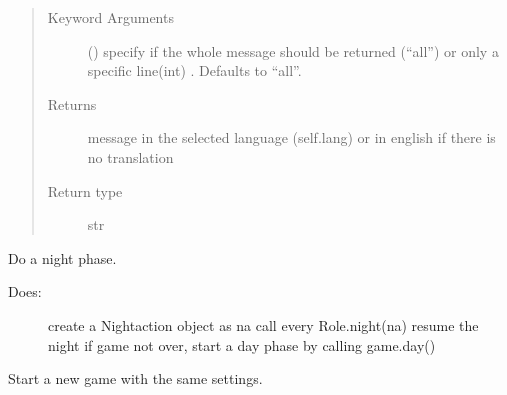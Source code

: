 \documentclass[letterpaper,10pt,english]{sphinxmanual}
\begin{document}
\begin{fulllineitems}
\begin{fulllineitems}
\begin{quote}
\begin{description}
\item[{Keyword Arguments}] \leavevmode
{} (\sphinxstyleliteralemphasis{\sphinxupquote{, }}) \textendash{} specify if the whole message should be returned (“all”)
or only a specific line(int) . Defaults to “all”.

\item[{Returns}] \leavevmode
message in the selected language (self.lang) or in english if there is no translation

\item[{Return type}] \leavevmode
str

\end{description}\end{quote}

\end{fulllineitems}


\begin{fulllineitems}
\label{\detokenize{chatwolf:chatwolf.game.Game.night}}
Do a night phase.
\begin{description}
\item[{Does:}] \leavevmode
create a Nightaction object as na
call every Role.night(na)
resume the night
if game not over, start a day phase by calling game.day()

\end{description}

\end{fulllineitems}


\begin{fulllineitems}
\label{\detokenize{chatwolf:chatwolf.game.Game.restart}}
Start a new game with the same settings.

\end{fulllineitems}



\end{fulllineitems}
\end{document}
